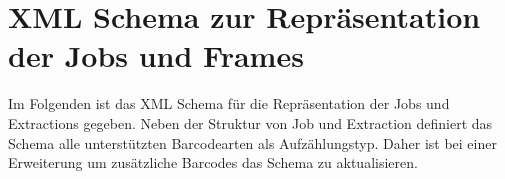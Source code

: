 \chapter{XML Schema zur Repräsentation der Jobs und Frames}
\writtenby{\dcauthornameewie}%
Im Folgenden ist das XML Schema für die Repräsentation der Jobs und Extractions gegeben.
Neben der Struktur von Job und Extraction definiert das Schema alle unterstützten Barcodearten als Aufzählungstyp.
Daher ist bei einer Erweiterung um zusätzliche Barcodes das Schema zu aktualisieren.

